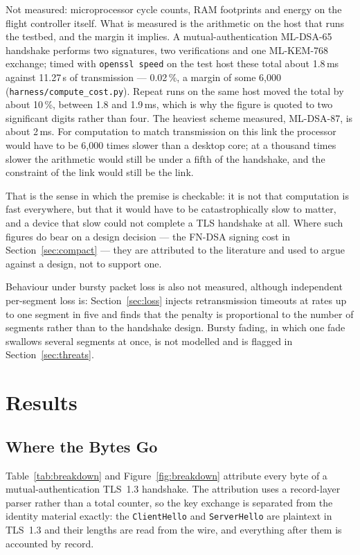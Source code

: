 \documentclass[drones,article,submit,pdftex,moreauthors]{Definitions/mdpi}
\newcommand{\mlkem}{ML-KEM}
\newcommand{\mldsa}{ML-DSA}
\newcommand{\fndsa}{FN-DSA}
\newcommand{\tls}{TLS}
\begin{document}
Not measured: microprocessor cycle counts, RAM footprints and energy on
the flight controller itself. What is measured is the arithmetic on the
host that runs the testbed, and the margin it implies. A
mutual-authentication \mldsa{}-65 handshake performs two signatures, two
verifications and one \mlkem{}-768 exchange; timed with
\texttt{openssl speed} on the test host these total about 1.8\,ms against
11.27\,s of transmission --- 0.02\,\%, a margin of some 6{,}000
(\texttt{harness/compute\_cost.py}). Repeat runs on the same host moved
the total by about 10\,\%, between 1.8 and 1.9\,ms, which is why the
figure is quoted to two significant digits rather than four. The heaviest
scheme measured, \mldsa{}-87, is about 2\,ms. For computation to match
transmission on this link the processor would have to be 6{,}000 times
slower than a desktop core; at a thousand times slower the arithmetic
would still be under a fifth of the handshake, and the constraint of the
link would still be the link.

That is the sense in which the premise is checkable: it is not that
computation is fast everywhere, but that it would have to be
catastrophically slow to matter, and a device that slow could not
complete a \tls{} handshake at all. Where such figures do bear on a
design decision --- the \fndsa{} signing cost in
Section~\ref{sec:compact} --- they are attributed to the literature and
used to argue against a design, not to support one.

Behaviour under bursty packet loss is also not measured, although
independent per-segment loss is: Section~\ref{sec:loss} injects
retransmission timeouts at rates up to one segment in five and finds
that the penalty is proportional to the number of segments rather than
to the handshake design. Bursty fading, in which one fade swallows
several segments at once, is not modelled and is flagged in
Section~\ref{sec:threats}.

\section{Results}
\label{sec:results}

\subsection{Where the Bytes Go}
\label{sec:attribution}

Table~\ref{tab:breakdown} and Figure~\ref{fig:breakdown} attribute every
byte of a mutual-authentication \tls{}~1.3 handshake. The attribution
uses a record-layer parser rather than a total counter, so the key
exchange is separated from the identity material exactly: the
\texttt{ClientHello} and \texttt{ServerHello} are plaintext in
\tls{}~1.3 and their lengths are read from the wire, and everything
after them is accounted by record.
\end{document}
